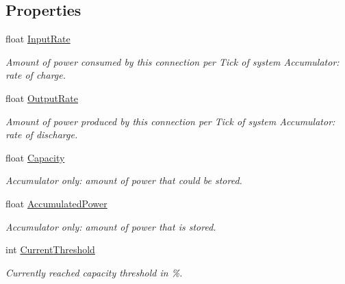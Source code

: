 \subsection*{Properties}
\begin{DoxyCompactItemize}
\item 
float \hyperlink{class_project_porcupine_1_1_power_network_1_1_connection_acfe6d4414e5325fcf2c307a5194954ad}{Input\+Rate}
\begin{DoxyCompactList}\small\item\em Amount of power consumed by this connection per Tick of system Accumulator\+: rate of charge. \end{DoxyCompactList}\item 
float \hyperlink{class_project_porcupine_1_1_power_network_1_1_connection_a35c52a9733ec8f930195689f21958ca6}{Output\+Rate}
\begin{DoxyCompactList}\small\item\em Amount of power produced by this connection per Tick of system Accumulator\+: rate of discharge. \end{DoxyCompactList}\item 
float \hyperlink{class_project_porcupine_1_1_power_network_1_1_connection_af4314a4bdbe686214f9bb754344dce62}{Capacity}
\begin{DoxyCompactList}\small\item\em Accumulator only\+: amount of power that could be stored. \end{DoxyCompactList}\item 
float \hyperlink{class_project_porcupine_1_1_power_network_1_1_connection_a34c8831e5821882648e5860d48ffde63}{Accumulated\+Power}
\begin{DoxyCompactList}\small\item\em Accumulator only\+: amount of power that is stored. \end{DoxyCompactList}\item 
int \hyperlink{class_project_porcupine_1_1_power_network_1_1_connection_a17d14e72394292e340bffac74493aa99}{Current\+Threshold}
\begin{DoxyCompactList}\small\item\em Currently reached capacity threshold in \%. \end{DoxyCompactList}\item 

\end{DoxyCompactItemize}
